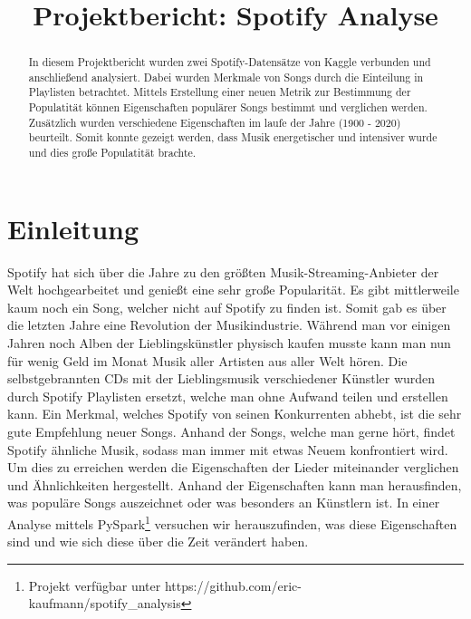 \documentclass[conference]{IEEEtran}
\begin{document}
\title{Projektbericht: Spotify Analyse\\}

\author{
\and
{}
}

\maketitle

\begin{abstract}
In diesem Projektbericht wurden zwei Spotify-Datensätze von Kaggle verbunden und anschließend analysiert. Dabei wurden Merkmale von Songs durch die Einteilung in Playlisten betrachtet. Mittels Erstellung einer neuen Metrik zur Bestimmung der Populatität können Eigenschaften populärer Songs bestimmt und verglichen werden. Zusätzlich wurden verschiedene Eigenschaften im laufe der Jahre (1900 - 2020) beurteilt. Somit konnte gezeigt werden, dass Musik energetischer und intensiver wurde und dies große Populatität brachte.
\end{abstract}

\section{Einleitung}

Spotify hat sich über die Jahre zu den größten Musik-Streaming-Anbieter der Welt hochgearbeitet und genießt eine sehr große Popularität. Es gibt mittlerweile kaum noch ein Song, welcher nicht auf Spotify zu finden ist. Somit gab es über die letzten Jahre eine Revolution der Musikindustrie. Während man vor einigen Jahren noch Alben der Lieblingskünstler physisch kaufen musste kann man nun für wenig Geld im Monat Musik aller Artisten aus aller Welt hören. Die selbstgebrannten CDs mit der Lieblingsmusik verschiedener Künstler wurden durch Spotify Playlisten ersetzt, welche man ohne Aufwand teilen und erstellen kann. Ein Merkmal, welches Spotify von seinen Konkurrenten abhebt, ist die sehr gute Empfehlung neuer Songs. Anhand der Songs, welche man gerne hört, findet Spotify ähnliche Musik, sodass man immer mit etwas Neuem konfrontiert wird. Um dies zu erreichen werden die Eigenschaften der Lieder miteinander verglichen und Ähnlichkeiten hergestellt. Anhand der Eigenschaften kann man herausfinden, was populäre Songs auszeichnet oder was besonders an Künstlern ist. In einer Analyse mittels PySpark\footnote{Projekt verfügbar unter https://github.com/eric-kaufmann/spotify\_analysis} versuchen wir herauszufinden, was diese Eigenschaften sind und wie sich diese über die Zeit verändert haben.
\end{document}
